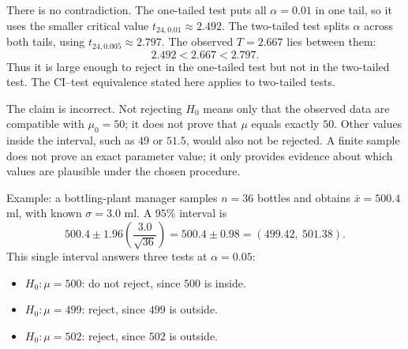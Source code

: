 \begin{solproblema}[prob:6517bf1]
There is no contradiction. The one-tailed test puts all $\alpha=0.01$ in one tail, so it uses the smaller critical value $t_{24,0.01}\approx2.492$. The two-tailed test splits $\alpha$ across both tails, using $t_{24,0.005}\approx2.797$. The observed $T=2.667$ lies between them:
\[
	2.492<2.667<2.797.
\]
Thus it is large enough to reject in the one-tailed test but not in the two-tailed test. The CI--test equivalence stated here applies to two-tailed tests.
\end{solproblema}

\begin{solproblema}[prob:4f1ea6b]
The claim is incorrect. Not rejecting $H_0$ means only that the observed data are compatible with $\mu_0=50$; it does not prove that $\mu$ equals exactly $50$. Other values inside the interval, such as $49$ or $51.5$, would also not be rejected. A finite sample does not prove an exact parameter value; it only provides evidence about which values are plausible under the chosen procedure.
\end{solproblema}

\begin{solproblema}[prob:1e58b99]
Example: a bottling-plant manager samples $n=36$ bottles and obtains $\bar x=500.4$ ml, with known $\sigma=3.0$ ml. A $95\%$ interval is
\[
	500.4\pm1.96\left(\frac{3.0}{\sqrt{36}}\right)
	=500.4\pm0.98=(499.42,\ 501.38).
\]
This single interval answers three tests at $\alpha=0.05$:
\begin{itemize}
	\item $H_0:\mu=500$: do not reject, since $500$ is inside.
	\item $H_0:\mu=499$: reject, since $499$ is outside.
	\item $H_0:\mu=502$: reject, since $502$ is outside.
\end{itemize}
\end{solproblema}
